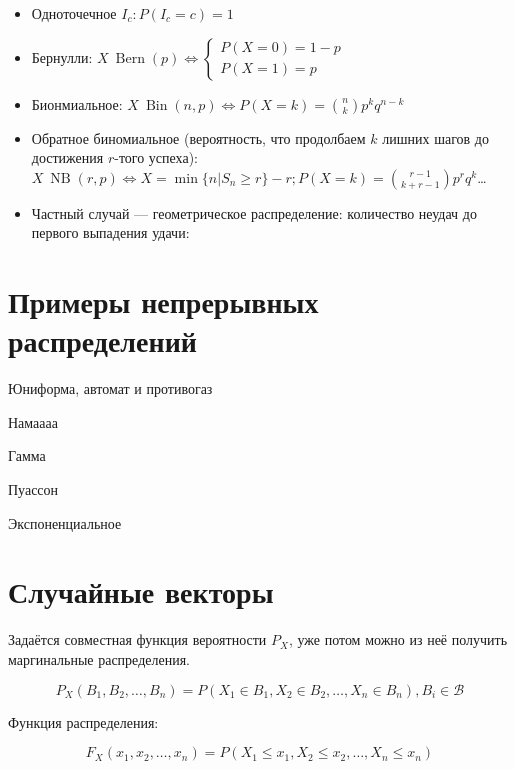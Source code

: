 \documentclass[12pt, a4paper, oneside]{article}
\begin{document}
\begin{itemize}
    \item Одноточечное $I_c: P\left( I_c = c \right) = 1$
    \item Бернулли: $X ~ \operatorname{Bern}\left( p \right) \Leftrightarrow \begin{cases}
        P(X = 0) = 1 - p \\
        P(X = 1) = p
    \end{cases}$
    \item Бионмиальное: $X ~ \operatorname{Bin}\left( n, p \right) \Leftrightarrow P(X = k) = {n \choose k} p^k q^{n - k}$
    \item Обратное биномиальное (вероятность, что продолбаем $k$ лишних шагов до достижения $r$-того успеха): $X ~ \operatorname{NB}\left( r, p \right) \Leftrightarrow X = \min \{ n | S_n \geqslant r \} - r; P(X = k) = {r - 1 \choose k + r - 1} p^r q^{k}$\ldots
    \item Частный случай — геометрическое распределение: количество неудач до первого выпадения удачи: 
\end{itemize}




\section{Примеры непрерывных распределений}

Юниформа, автомат и противогаз

Намаааа

Гамма

Пуассон

Экспоненциальное

\section{Случайные векторы}

Задаётся совместная функция вероятности $P_{X}$, уже потом можно из неё получить маргинальные распределения.

\begin{equation}
    P_{X}(B_1, B_2, \ldots, B_n) = P(X_1 \in B_1, X_2 \in B_2, \ldots, X_n \in B_n), B_i \in \mathcal{B}
\end{equation}

Функция распределения:

\begin{equation}
    F_{X}(x_1, x_2, \ldots, x_n) = P(X_1 \leqslant x_1, X_2 \leqslant x_2, \ldots, X_n \leqslant x_n)
\end{equation}
\end{document}
